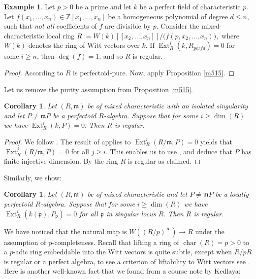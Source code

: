 \documentclass[12pt,reqno]{amsart}
\newtheorem{corollary}[theorem]{Corollary}
\theoremstyle{definition}
\newtheorem{example}[theorem]{Example}
\theoremstyle{remark}
\theoremstyle{cited}
\theoremstyle{remark}
\theoremstyle{citeddef}
\DeclareMathOperator{\Deg}{deg}
\newcommand{\fm}{\mathfrak{m}}
\newcommand{\fp}{\mathfrak{p}}
\newcommand{\perf}{\infty}
\begin{document}
	
	\begin{example}Let $p > 0$ be a prime and let $k$ be a perfect field of characteristic $p$.  
		Let 
		\(
		f(x_1, \dots, x_n) \in \mathbb{Z}[x_1, \dots, x_n]
		\)
		be a homogeneous polynomial of degree $d \le n$, such that \emph{not all} coefficients of $f$ are divisible by $p$.
		Consider the mixed-characteristic local ring
		\(
		R := W(k)[\![x_2, \dots, x_n]\!] \big/ \big( f(p, x_2, \dots, x_n) \big),
		\)
		where $W(k)$ denotes the ring of Witt vectors over $k$.  
		If 
		\(
		\operatorname{Ext}_R^i(k, R_{perfd}) = 0
		\)
		for  some \(i \geq n\), then $\Deg(f)=1$, and so  \(R\) is regular.
	\end{example}
	
	\begin{proof}
		According to \cite[Example 6.7]{ket}  $R$ is perfectoid-pure. Now, apply {Proposition} \ref{m515}.
	\end{proof}
	Let us remove the  purity assumption from Proposition \ref{m515}.
	
	\begin{corollary}\label{isom}
		Let $(R, \mathfrak{m})$ be of mixed characteristic with an isolated singularity and let $P\neq \fm P$ be a  perfectoid $R$-algebra. Suppose that for some $i \geq \dim(R)$  we have
		\(
		\operatorname{Ext}_{R}^i(k, P) = 0.
		\)
		Then $R$ is regular.
	\end{corollary}
	\begin{proof}We follow \cite[5.17]{Elham}.
		The result of \cite[1.2]{IYENGAR} applies to \(\operatorname{Ext}_R^i(R/\mathfrak{m}, P) = 0\) yields that \(\operatorname{Ext}_R^j(R/\mathfrak{m}, P) = 0\) for all \(j\ge i\). 
		This   enables us to use \cite[Theorem VI.9]{sc3}, and deduce that \(P\) has finite injective dimension. 
		By \cite[Theorem 3.15]{Ryo} the ring $R$ is regular as claimed.\end{proof}
	
	Similarly, we show:
	
	\begin{corollary}
		Let $(R, \mathfrak{m})$ be of mixed characteristic and let $P\neq \fm P$ be a  locally perfectoid $R$-algebra. Suppose that for some $i \geq \dim(R)$  we have
		\(
		\operatorname{Ext}_{R}^i(k(\fp), P_{\fp}) = 0
		\) for all $\fp$ in singular locus $R$.
		Then $R$ is regular.
	\end{corollary}
	
	We have noticed that the natural map is
	$W((R/p)^\perf)  \to R$
	under the assumption of p-completeness.
	Recall that lifting a ring of $\operatorname{char}(R)= p>0$ to a $p$-adic ring embeddable into the Witt vectors is quite subtle,
	except when $R/pR$ is regular or a perfect algebra, to see a criterion of liftability to Witt vectors see \cite{SZ,Shi15}. Here is another well-known fact that we found from a course note by Kedlaya:
	
\end{document}
